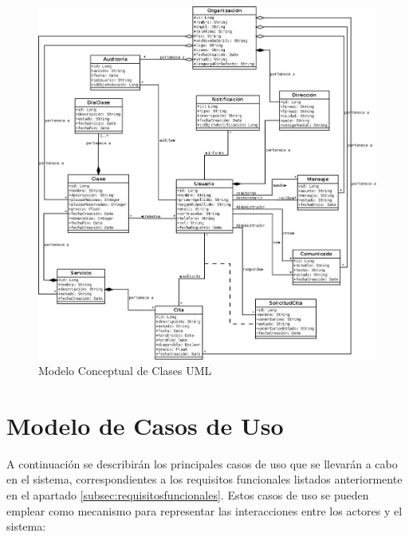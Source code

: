 \begin{figure}
\centering
  \includegraphics[scale=.35]{img/modelo-conceptual.jpeg}
  \caption{Modelo Conceptual de Clases UML}
  \label{fig:modelo-conceptual}
\end{figure}


\section{Modelo de Casos de Uso}

A continuación se describirán los principales casos de uso que se llevarán a cabo en el sistema, correspondientes a los requisitos funcionales listados anteriormente en el apartado \ref{subsec:requisitosfuncionales}. Estos casos de uso se pueden emplear como mecanismo para representar las interacciones entre los actores y el sistema:


